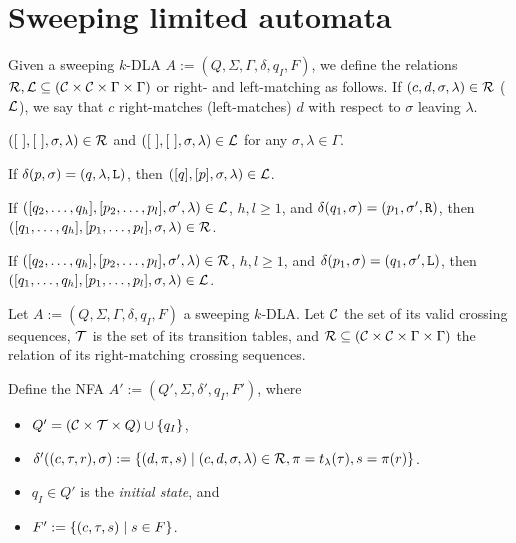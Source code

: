 \chapter{Sweeping limited automata}


\begin{defn}
	Given a sweeping $k$-DLA $A:=(Q,\Sigma,\Gamma,\delta,q_I,F)$, we define the relations $\mathcal R,\mathcal L\subseteq(\mathcal C\times\mathcal C\times\Gamma\times\Gamma)$ or right- and left-matching as follows.
	If $(c,d,\sigma,\lambda)\in\mathcal R$ ($\mathcal L$), we say that $c$ right-matches (left-matches) $d$ with respect to $\sigma$ leaving $\lambda$.
	\begin{rules}
		\item \label{itm:crossmatchswepDLA-1} $([~],[~],\sigma,\lambda)\in\mathcal R$ and $([~],[~],\sigma,\lambda)\in\mathcal L$ for any $\sigma,\lambda\in\Gamma$. %
		\item \label{itm:crossmatchswepDLA-2} If $\delta(p,\sigma)=(q,\lambda,\mathtt L)$, then $([q],[p],\sigma,\lambda)\in\mathcal L$.
		\item \label{itm:crossmatchswepDLA-3} If $([q_2,\dots,q_h], [p_2,\dots,p_l], \sigma', \lambda) \in \mathcal L$, $h,l\ge1$, and $\delta(q_1,\sigma)=(p_1,\sigma',\mathtt R)$, then $([q_1,\dots,q_h],[p_1,\dots,p_l],\sigma,\lambda)\in\mathcal R$.
		\item \label{itm:crossmatchswepDLA-4} If $([q_2,\dots,q_h], [p_2,\dots,p_l], \sigma', \lambda) \in \mathcal R$, $h,l\ge1$, and $\delta(p_1,\sigma)=(q_1,\sigma',\mathtt L)$, then $([q_1,\dots,q_h],[p_1,\dots,p_l],\sigma,\lambda)\in\mathcal L$.
	\end{rules}
\end{defn}


Let $A:=(Q,\Sigma,\Gamma,\delta,q_I,F)$ a sweeping $k$-DLA.
Let $\mathcal C$ the set of its valid crossing sequences, $\mathcal T$ is the set of its transition tables, and $\mathcal R\subseteq(\mathcal C\times\mathcal C\times\Gamma\times\Gamma)$ the relation of its right-matching crossing sequences.

Define the NFA $A':=(Q',\Sigma,\delta',q_I,F')$, where
\begin{itemize}
	\item $Q'=(\mathcal C\times\mathcal T\times Q)\cup\{q_I\}$,
	\item $\delta'((c,\tau,r),\sigma):=\{(d,\pi,s) \mid (c,d,\sigma,\lambda)\in\mathcal R, \pi=t_\lambda(\tau), s=\pi(r)\}$.
	\item $q_I\in Q'$ is the \emph{initial state}, and
	\item $F':=\{(c,\tau,s)\mid s\in F\}$.
\end{itemize}
